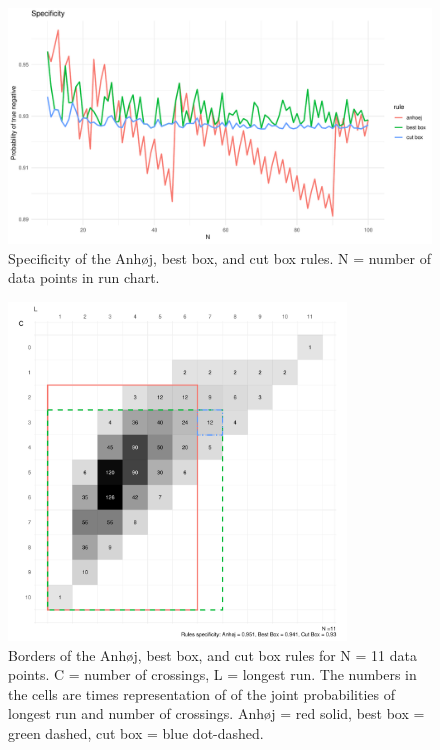 \begin{figure}[htbp]
  \centering
  \includegraphics[width=\textwidth]{fig_spec.pdf}
  \caption{Specificity of the Anhøj, best box, and cut box rules. N = number of data points in run chart. }
  \label{figure:spec}
\end{figure}

\begin{figure}[htbp]
  \centering
  \includegraphics[width=0.8\textwidth]{fig_box11.pdf}
  \caption{Borders of the Anhøj, best box, and cut box rules for N = 11 data points. 
           C = number of crossings, L = longest run.
           The numbers in the cells are times representation of of the joint
           probabilities of longest run and number of crossings.
           Anhøj = red solid, best box = green dashed, cut box = blue dot-dashed.}
  \label{figure:box11}
\end{figure}

